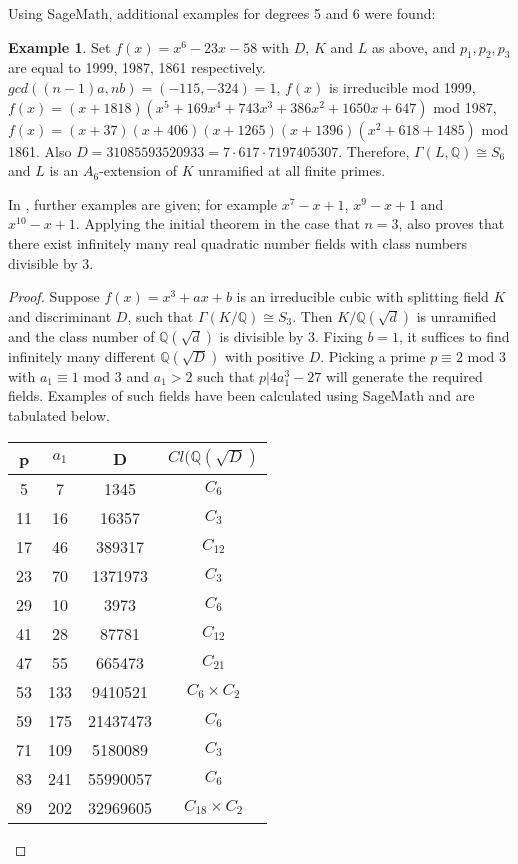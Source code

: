 \documentclass[12pt]{extarticle}
\newcommand{\Q}{\mathbb{Q}}
\newcommand{\<}{\langle}
\renewcommand{\>}{\rangle}
\theoremstyle{definition}
\newtheorem*{example}{Example}
\begin{document}
Using SageMath, additional examples for degrees 5 and 6 were found:
\begin{example}
Set $f(x)= x^6-23x-58$ with $D$, $K$ and $L$ as above, and $p_1,p_2,p_3$ are equal to 1999, 1987, 1861 respectively. $gcd((n-1)a,nb) = (-115,-324)=1$, $f(x)$ is irreducible mod 1999, $f(x)=(x + 1818)(x^5 + 169x^4 + 743x^3+386x^2+1650x+647)$ mod 1987, $f(x)=(x + 37)(x + 406)(x + 1265)(x+1396)(x^2 + 618 + 1485)$ mod 1861. Also $D = 31085593520933 = 7 \cdot 617 \cdot 7197405307$. Therefore, $\Gamma(L,\Q) \cong S_6$ and $L$ is an $A_6$-extension of $K$ unramified at all finite primes.
\end{example}
In \cite{uchida1970}, further examples are given; for example $x^7-x+1$, $x^9-x+1$ and $x^{10}-x+1$. 
Applying the initial theorem in the case that $n=3$, \cite{uchida1970} also proves that there exist infinitely many real quadratic number fields with class numbers divisible by 3. 
\begin{proof}
Suppose $f(x) = x^3+ax+b$ is an irreducible cubic with splitting field $K$ and discriminant $D$, such that $\Gamma(K/\Q) \cong S_3$. Then $K/\Q(\sqrt{d})$ is unramified and the class number of $\Q(\sqrt{d})$ is divisible by 3.  Fixing $b=1$, it suffices to find infinitely many different $\Q(\sqrt{D})$ with positive $D$. Picking a prime $p \equiv 2$ mod 3 with $a_1 \equiv 1$ mod 3 and $a_1 > 2$ such that $p | 4a_1^3 - 27$ will generate the required fields. Examples of such fields have been calculated using SageMath and are tabulated below.
\begin{center}
 \begin{tabular}{| c | c | c | c |}
 \hline
p & $a_1$ & D & $Cl(\Q(\sqrt{D})$  \\ 
\hline
5 &  7 & 1345 & $C_{6}$ \\
\hline
11 &  16 & 16357 & $C_{3}$ \\
\hline
17 &  46 & 389317 & $C_{12}$ \\
\hline
23 &  70 & 1371973 & $C_{3}$ \\
\hline
29 &  10 & 3973 & $C_{6}$ \\
\hline
41 &  28 & 87781 & $C_{12}$ \\
\hline
47 &  55 & 665473 & $C_{21}$ \\
\hline
53 &  133 & 9410521 & $C_{6} \times C_{2}$ \\
\hline
59 &  175 & 21437473 & $C_{6}$ \\
\hline
71 &  109 & 5180089 & $C_{3}$ \\
\hline
83 &  241 & 55990057 & $C_{6}$ \\
\hline
89 &  202 & 32969605 & $C_{18} \times C_{2}$ \\
\hline
\end{tabular}
\end{center}
\end{proof}
\end{document}

